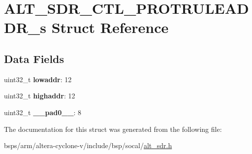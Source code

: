 \hypertarget{structALT__SDR__CTL__PROTRULEADDR__s}{}\section{A\+L\+T\+\_\+\+S\+D\+R\+\_\+\+C\+T\+L\+\_\+\+P\+R\+O\+T\+R\+U\+L\+E\+A\+D\+D\+R\+\_\+s Struct Reference}
\label{structALT__SDR__CTL__PROTRULEADDR__s}
\subsection*{Data Fields}
\begin{DoxyCompactItemize}
\item 
\mbox{\label{structALT__SDR__CTL__PROTRULEADDR__s_aa8d0a72cf86c3cd8f4fe6225d44243a0}} 
uint32\+\_\+t {\bfseries lowaddr}\+: 12
\item 
\mbox{\label{structALT__SDR__CTL__PROTRULEADDR__s_af5d9111351552a6f4d177d8b56435aa9}} 
uint32\+\_\+t {\bfseries highaddr}\+: 12
\item 
\mbox{\label{structALT__SDR__CTL__PROTRULEADDR__s_aa9e61570419ddbac23d1af66ddeafa8a}} 
uint32\+\_\+t {\bfseries \+\_\+\+\_\+pad0\+\_\+\+\_\+}\+: 8
\end{DoxyCompactItemize}


The documentation for this struct was generated from the following file\+:\begin{DoxyCompactItemize}
\item 
bsps/arm/altera-\/cyclone-\/v/include/bsp/socal/\mbox{\hyperlink{alt__sdr_8h}{alt\+\_\+sdr.\+h}}\end{DoxyCompactItemize}
